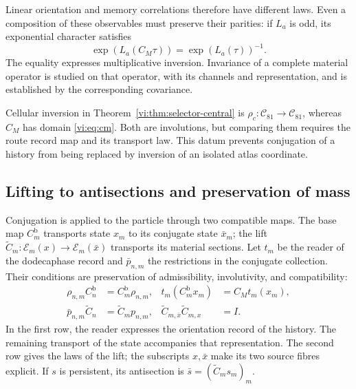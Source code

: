 Linear orientation and memory correlations therefore have
different laws. Even a composition of these observables must
preserve their parities: if $L_a$ is odd, its exponential character
satisfies
\begin{equation}
 \exp(L_a(C_M\tau))=\exp(L_a(\tau))^{-1}.
 \label{vi:eq:caracter-inverso}
\end{equation}
The equality expresses multiplicative inversion. Invariance of a
complete material operator is studied on that operator, with its
channels and representation, and is established by the corresponding
covariance.

Cellular inversion in Theorem~\ref{vi:thm:selector-central} is
$\rho_c:\mathcal C_{81}\to\mathcal C_{81}$, whereas $C_M$ has
domain \eqref{vi:eq:cm}. Both are involutions, but comparing
them requires the route record map and its transport
law. This datum prevents conjugation of a history from being replaced
by inversion of an isolated atlas coordinate.

\subsection{Lifting to antisections and preservation of mass}
\label{vi:subsec:antisecciones}

Conjugation is applied to the particle through two compatible
maps. The base map $C_m^{\mathrm b}$ transports state
$x_m$ to its conjugate state $\bar x_m$; the lift
$\widetilde C_m:\mathscr E_m(x)\to\mathscr E_m(\bar x)$
transports its material sections. Let $t_m$ be the reader of the
dodecaphase record and $\bar p_{n,m}$ the restrictions in the
conjugate collection. Their conditions are preservation of
admissibility, involutivity, and compatibility:
\begin{equation}
 \begin{aligned}
 \rho_{n,m}C_n^{\mathrm b}&=C_m^{\mathrm b}\rho_{n,m},
 &t_m(C_m^{\mathrm b}x_m)&=C_Mt_m(x_m),\\
 \bar p_{n,m}\widetilde C_n&=\widetilde C_mp_{n,m},
 &\widetilde C_{m,\bar x}\widetilde C_{m,x}&=I.
 \end{aligned}
 \label{vi:eq:levantamiento-cm}
\end{equation}
In the first row, the reader expresses the orientation record
of the history. The remaining transport of the state accompanies that
representation. The second row gives the laws of the lift;
the subscripts $x,\bar x$ make its two source fibres explicit.
If $s$ is persistent, its antisection is
$\bar s=(\widetilde C_ms_m)_m$.

